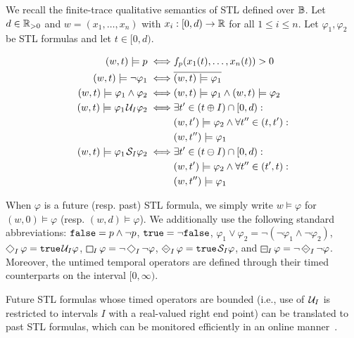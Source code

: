 We recall the finite-trace qualitative semantics of STL defined over $\mathbb{B}$.
Let $d \in \mathbb{R}_{> 0}$ and $w = (x_1, \ldots, x_n)$ with $x_i : [0,d) \to \mathbb{R}$ for all $1 \leq i \leq n$.
Let $\varphi_1, \varphi_2$ be STL formulas and let $t \in [0,d)$.

\begin{align*}
	(w,t) \models p \iff & f_p(x_1(t), \ldots, x_n(t)) > 0 \\
	(w,t) \models \lnot \varphi_1 \iff & \overline{(w,t) \models \varphi_1} \\
	(w,t) \models \varphi_1 \land \varphi_2 \iff & (w,t) \models \varphi_1 \land (w,t) \models \varphi_2 \\
	(w,t) \models \varphi_1 \kern.1em\mathcal{U}_I \varphi_2 \iff & \exists t' \in (t \oplus I) \cap [0,d) :  \\
	& (w,t') \models \varphi_2 \land \forall t'' \in (t, t') : \\
	& (w,t'') \models \varphi_1\\
	(w,t) \models \varphi_1 \kern.1em\mathcal{S}_I \varphi_2 \iff & \exists t' \in (t \ominus I) \cap [0,d) :  \\
	& (w,t') \models \varphi_2 \land \forall t'' \in (t', t) : \\
	& (w,t'') \models \varphi_1
\end{align*}

When $\varphi$ is a future (resp. past) STL formula, we simply write $w \models \varphi$ for $(w,0) \models \varphi$ (resp. $(w,d) \models \varphi$).
We additionally use the following standard abbreviations: 
$\texttt{false} = p \land \lnot p$,
$\texttt{true} = \lnot \texttt{false}$,
$ \varphi_1 \lor \varphi_2 = \lnot (\lnot \varphi_1 \land \lnot \varphi_2)$,
$\LTLf_I \varphi = \true \until_I \varphi$,
$\LTLg_I \varphi = \lnot \LTLf_I \lnot \varphi$,
$\LTLdiamondminus_I \varphi = \true \since_I \varphi$, and
$\LTLsquareminus_I \varphi = \lnot \LTLdiamondminus_I \lnot \varphi$.
Moreover, the untimed temporal operators are defined through their timed counterparts on the interval $[0,\infty)$.

Future STL formulas whose timed operators are bounded (i.e., use of $\kern.1em\mathcal{U}_I$ is restricted to intervals $I$ with a real-valued right end point) can be translated to past STL formulas, which can be monitored efficiently in an online manner~\cite{MalerNP07,JaksicBGKNN15,Gol18}.
\egroup

